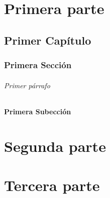 \documentclass[11pt,a4paper]{book}
\author{Juan Carlos Tapia}
\begin{document}
\tableofcontents

\part{Primera parte}

\chapter{Primer Capítulo}

\lipsum[1]

\section{Primera Sección}

\lipsum[1]

\paragraph{Primer párrafo}

\lipsum[1]

\subsection{Primera Subección}

\lipsum[1]

\part{Segunda parte}

\part{Tercera parte}
\end{document}
